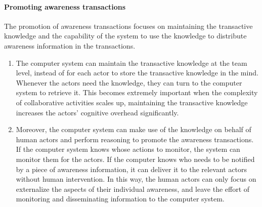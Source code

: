 \paragraph*{Promoting awareness transactions} %
\label{par:promoting_awareness_transactions}
The promotion of awareness transactions focuses on maintaining the transactive knowledge and the capability of the system to use the knowledge to distribute awareness information in the transactions. 
\begin{enumerate}
   \item The computer system can maintain the transactive knowledge at the team level, instead of for each actor to store the transactive knowledge in the mind. Whenever the actors need the knowledge, they can turn to the computer system to retrieve it. This becomes extremely important when the complexity of collaborative activities scales up, maintaining the transactive knowledge increases the actors’ cognitive overhead significantly.
   \item Moreover, the computer system can make use of the knowledge on behalf of human actors and perform reasoning to promote the awareness transactions. If the computer system knows whose actions to monitor, the system can monitor them for the actors. If the computer knows who needs to be notified by a piece of awareness information, it can deliver it to the relevant actors without human intervention. In this way, the human actors can only focus on externalize the aspects of their individual awareness, and leave the effort of monitoring and disseminating information to the computer system.
\end{enumerate}

